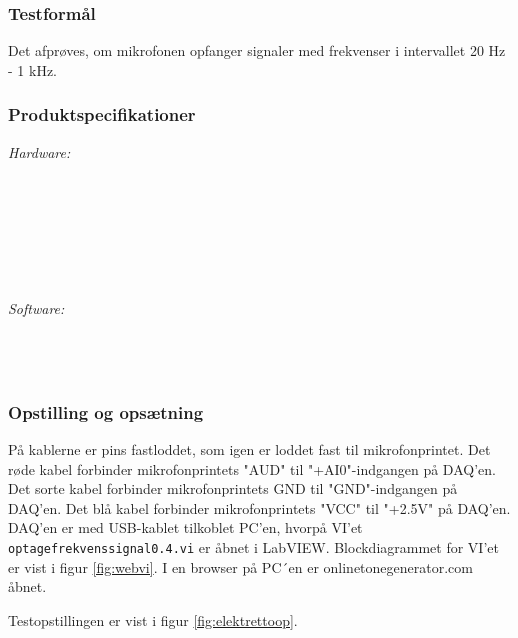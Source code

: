 		\subsubsection{Testformål}
		Det afprøves, om mikrofonen opfanger signaler med frekvenser i intervallet 20 Hz - 1 kHz.
		
		\subsubsection{Produktspecifikationer}
	
			\textit{Hardware:}\\
			\elektretto\\
			\pinstre\\
			\mikrofonkabel\\
			\krympeflex\\
			\daq\\
			\daqusb\\			
			\PC\\
	
			\textit{Software:}\\
			\labview\\
			\daqsoft\\
			\onlineg\\

	
		\subsubsection{Opstilling og opsætning}
		På kablerne er pins fastloddet, som igen er loddet fast til mikrofonprintet. Det røde kabel forbinder mikrofonprintets "AUD" til "+AI0"-indgangen på DAQ'en. Det sorte kabel forbinder mikrofonprintets GND til "GND"-indgangen på DAQ'en. Det blå kabel forbinder mikrofonprintets "VCC" til "+2.5V" på DAQ'en. DAQ'en er med USB-kablet tilkoblet PC'en, hvorpå VI'et \texttt{optagefrekvenssignal0.4.vi} er åbnet i LabVIEW. Blockdiagrammet for VI'et er vist i figur \ref{fig:webvi}. I en browser på PC´en er onlinetonegenerator.com åbnet.       
		
		Testopstillingen er vist i figur \ref{fig:elektrettoop}.\\
		
